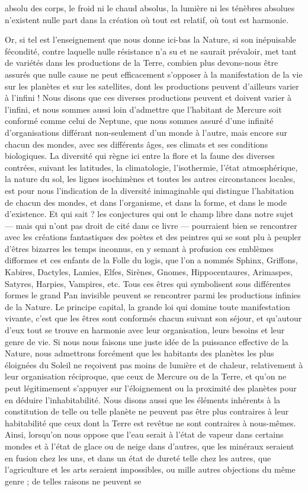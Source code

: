 \documentclass[a4paper, 11pt, oneside]{article}
\begin{document}
absolu des corps, le froid ni le chaud absolus, la lumière ni les ténèbres absolues n'existent nulle part dans la création où tout est relatif, où tout est harmonie.

Or, si tel est l'enseignement que nous donne ici-bas la Nature, si son inépuisable fécondité, contre laquelle nulle résistance n'a su et ne saurait prévaloir, met tant de variétés dans les productions de la Terre, combien plus devons-nous être assurés que nulle cause ne peut efficacement s'opposer à la manifestation de la vie sur les planètes et sur les satellites, dont les productions peuvent d'ailleurs varier à l'infini ! Nous disons que ces diverses productions peuvent et doivent varier à l'infini, et nous sommes aussi loin d'admettre que l'habitant de Mercure soit conformé comme celui de Neptune, que nous sommes assuré d'une infinité d'organisations différant non-seulement d'un monde à l'autre, mais encore sur chacun des mondes, avec ses différents âges, ses climats et ses conditions biologiques. La diversité qui règne ici entre la flore et la faune des diverses contrées, suivant les latitudes, la climatologie, l'isothermie, l'état atmosphérique, la nature du sol, les lignes isochimènes et toutes les autres circonstances locales, est pour nous l'indication de la diversité inimaginable qui distingue l'habitation de chacun des mondes, et dans l'organisme, et dans la forme, et dans le mode d'existence. Et qui sait ? les conjectures qui ont le champ libre dans notre sujet --- mais qui n'ont pas droit de cité dans ce livre --- pourraient bien se rencontrer avec les créations fantastiques des poètes et des peintres qui se sont plu à peupler d'êtres bizarres les temps inconnus, en y semant à profusion ces emblèmes difformes et ces enfants de la Folle du logis, que l'on a nommés Sphinx, Griffons, Kabires, Dactyles, Lamies, Elfes, Sirènes, Gnomes, Hippocentaures, Arimaspes, Satyres, Harpies, Vampires, etc. Tous ces êtres qui symbolisent sous différentes formes le grand Pan invisible peuvent se rencontrer parmi les productions infinies de la Nature. Le principe capital, la grande loi qui domine toute manifestation vivante, c'est que les êtres sont conformés chacun suivant son séjour, et qu'autour d'eux tout se trouve en harmonie avec leur organisation, leurs besoins et leur genre de vie. Si nous nous faisons une juste idée de la puissance effective de la Nature, nous admettrons forcément que les habitants des planètes les plus éloignées du Soleil ne reçoivent pas moins de lumière et de chaleur, relativement à leur organisation réciproque, que ceux de Mercure ou de la Terre, et qu'on ne peut légitimement s'appuyer sur l'éloignement ou la proximité des planètes pour en déduire l'inhabitabilité. Nous disons aussi que les éléments inhérents à la constitution de telle ou telle planète ne peuvent pas être plus contraires à leur habitabilité que ceux dont la Terre est revêtue ne sont contraires à nous-mêmes. Ainsi, lorsqu'on nous oppose que l'eau serait à l'état de vapeur dans certains mondes et à l'état de glace ou de neige dans d'autres, que les minéraux seraient en fusion chez les uns, et dans un état de dureté telle chez les autres, que l'agriculture et les arts seraient impossibles, ou mille autres objections du même genre ; de telles raisons ne peuvent se 
\end{document}
